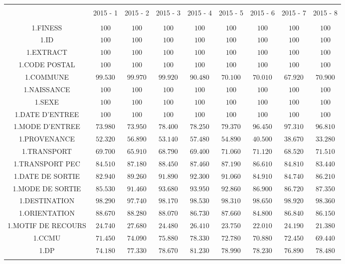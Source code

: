 \documentclass[]{article}
\begin{document}
\begin{table}[!htbp] \centering 
  \caption{} 
  \label{} 
\begin{tabular}{@{\extracolsep{5pt}} ccccccccc} 
\\[-1.8ex]\hline 
\hline \\[-1.8ex] 
 & 2015 - 1 & 2015 - 2 & 2015 - 3 & 2015 - 4 & 2015 - 5 & 2015 - 6 & 2015 - 7 & 2015 - 8 \\ 
\hline \\[-1.8ex] 
1.FINESS & $100$ & $100$ & $100$ & $100$ & $100$ & $100$ & $100$ & $100$ \\ 
1.ID & $100$ & $100$ & $100$ & $100$ & $100$ & $100$ & $100$ & $100$ \\ 
1.EXTRACT & $100$ & $100$ & $100$ & $100$ & $100$ & $100$ & $100$ & $100$ \\ 
1.CODE POSTAL & $100$ & $100$ & $100$ & $100$ & $100$ & $100$ & $100$ & $100$ \\ 
1.COMMUNE & $99.530$ & $99.970$ & $99.920$ & $90.480$ & $70.100$ & $70.010$ & $67.920$ & $70.900$ \\ 
1.NAISSANCE & $100$ & $100$ & $100$ & $100$ & $100$ & $100$ & $100$ & $100$ \\ 
1.SEXE & $100$ & $100$ & $100$ & $100$ & $100$ & $100$ & $100$ & $100$ \\ 
1.DATE D'ENTREE & $100$ & $100$ & $100$ & $100$ & $100$ & $100$ & $100$ & $100$ \\ 
1.MODE D'ENTREE & $73.980$ & $73.950$ & $78.400$ & $78.250$ & $79.370$ & $96.450$ & $97.310$ & $96.810$ \\ 
1.PROVENANCE & $52.320$ & $56.890$ & $53.140$ & $57.480$ & $54.890$ & $40.500$ & $38.670$ & $33.280$ \\ 
1.TRANSPORT & $69.700$ & $65.910$ & $68.790$ & $69.400$ & $71.060$ & $71.120$ & $68.520$ & $71.510$ \\ 
1.TRANSPORT PEC & $84.510$ & $87.180$ & $88.450$ & $87.460$ & $87.190$ & $86.610$ & $84.810$ & $83.440$ \\ 
1.DATE DE SORTIE & $82.940$ & $89.260$ & $91.890$ & $92.300$ & $91.060$ & $84.910$ & $84.740$ & $86.210$ \\ 
1.MODE DE SORTIE & $85.530$ & $91.460$ & $93.680$ & $93.950$ & $92.860$ & $86.900$ & $86.720$ & $87.350$ \\ 
1.DESTINATION & $98.290$ & $97.740$ & $98.170$ & $98.530$ & $98.310$ & $98.650$ & $98.920$ & $98.360$ \\ 
1.ORIENTATION & $88.670$ & $88.280$ & $88.070$ & $86.730$ & $87.660$ & $84.800$ & $86.840$ & $86.150$ \\ 
1.MOTIF DE RECOURS & $24.740$ & $27.680$ & $24.480$ & $26.410$ & $23.750$ & $22.010$ & $24.190$ & $21.380$ \\ 
1.CCMU & $71.450$ & $74.090$ & $75.880$ & $78.330$ & $72.780$ & $70.880$ & $72.450$ & $69.440$ \\ 
1.DP & $74.180$ & $77.330$ & $78.670$ & $81.230$ & $78.990$ & $78.230$ & $76.890$ & $78.480$ \\ 
\hline \\[-1.8ex] 
\end{tabular} 
\end{table}
\end{document}
